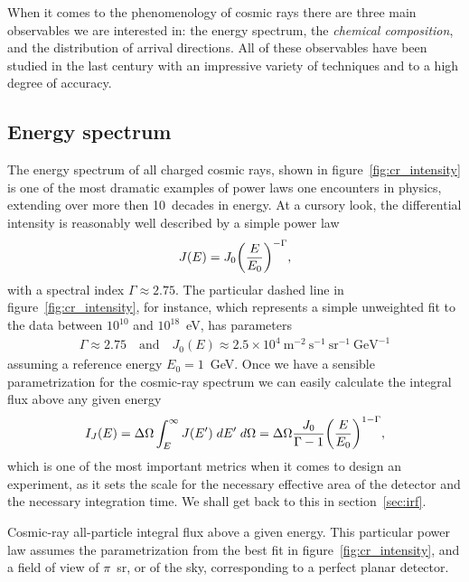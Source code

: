When it comes to the phenomenology of cosmic rays there are three main observables
we are interested in: the energy spectrum, the \emph{chemical composition}, and
the distribution of arrival directions. All of these observables have been studied
in the last century with an impressive variety of techniques and to a high degree
of accuracy.


\subsection{Energy spectrum}

The energy spectrum of all charged cosmic rays, shown in figure~\ref{fig:cr_intensity}
is one of the most dramatic examples of power laws one encounters in physics,
extending over more then 10~decades in energy. At a cursory look, the differential
intensity is reasonably well described by a simple power law
\begin{align}
  J(E) = J_0 \qty(\frac{E}{E_0})^{-\Gamma},
\end{align}
with a spectral index $\Gamma \approx 2.75$. The particular dashed line in
figure~\ref{fig:cr_intensity}, for instance, which represents a simple unweighted
fit to the data between $10^{10}$ and $10^{18}$~eV, has parameters
\begin{align*}
  \Gamma \approx 2.75 \quad\text{and}\quad
  J_0(E) \approx 2.5 \times 10^4~\text{m}^{-2}~\text{s}^{-1}~\text{sr}^{-1}~\text{GeV}^{-1}
\end{align*}
assuming a reference energy $E_0 = 1$~GeV. Once we have a sensible parametrization
for the cosmic-ray spectrum we can easily calculate the integral flux above any
given energy
\begin{align}\label{eq:cr_integral_flux}
  I_J(E) = \Delta\Omega \int_E^\infty J(E') \;d{E'} \;d{\Omega} =
  \Delta\Omega\frac{J_0}{\Gamma - 1} \qty(\frac{E}{E_0})^{1 - \Gamma},
\end{align}
which is one of the most important metrics when it comes to design an experiment,
as it sets the scale for the necessary effective area of the detector and the
necessary integration time. We shall get back to this in section~\ref{sec:irf}.

\begin{marginfigure}
  
  \caption{Cosmic-ray all-particle integral flux above a given energy. This particular
  power law assumes the parametrization from the best fit in figure~\ref{fig:cr_intensity},
  and a field of view of $\pi$~sr, or  of the sky, corresponding to
  a perfect planar detector.}
  \label{fig:cr_integral_flux}
\end{marginfigure}

